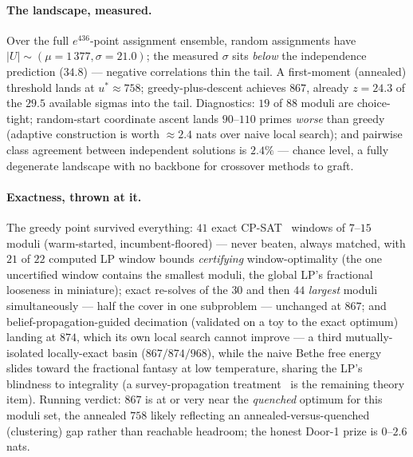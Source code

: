 \paragraph{The landscape, measured.} Over the full $e^{436}$-point
assignment ensemble, random assignments have $|U|\sim(\mu=1\,377,
\sigma=21.0)$; the measured $\sigma$ sits \emph{below} the
independence prediction ($34.8$) --- negative correlations thin the
tail. A first-moment (annealed) threshold lands at $u^*\approx758$;
greedy-plus-descent achieves $867$, already $z=24.3$ of the $29.5$
available sigmas into the tail. Diagnostics: $19$ of $88$ moduli are
choice-tight; random-start coordinate ascent lands $90$--$110$ primes
\emph{worse} than greedy (adaptive construction is worth
$\approx2.4$ nats over naive local search); and pairwise class
agreement between independent solutions is $2.4\%$ --- chance level, a
fully degenerate landscape with no backbone for crossover methods to
graft.

\paragraph{Exactness, thrown at it.} The greedy point survived
everything: $41$ exact CP-SAT~\cite{ORtools} windows of $7$--$15$
moduli (warm-started, incumbent-floored) --- never beaten, always
matched, with $21$ of $22$ computed LP window bounds \emph{certifying}
window-optimality (the one uncertified window contains the smallest
moduli, the global LP's fractional looseness in miniature); exact
re-solves of the $30$ and then $44$ \emph{largest} moduli
simultaneously --- half the cover in one subproblem --- unchanged at
$867$; and belief-propagation-guided decimation (validated on a toy to
the exact optimum) landing at $874$, which its own local search cannot
improve --- a third mutually-isolated locally-exact basin
($867/874/968$), while the naive Bethe free energy slides toward the
fractional fantasy at low temperature, sharing the LP's blindness to
integrality (a survey-propagation treatment~\cite{MPZ} is the remaining
theory item). Running verdict: $867$ is at or very near the
\emph{quenched} optimum for this moduli set, the annealed $758$ likely
reflecting an annealed-versus-quenched (clustering) gap rather than
reachable headroom; the honest Door-1 prize is $0$--$2.6$ nats.

